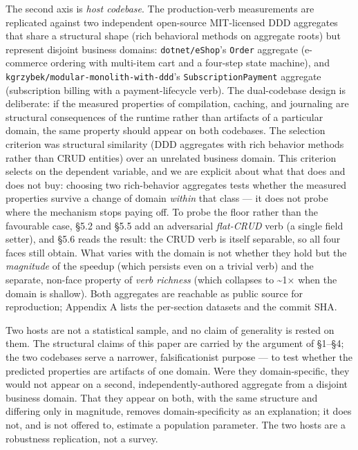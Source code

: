 \documentclass[
]{article}
\let\origtexttt\texttt%
\renewcommand{\texttt}[1]{\origtexttt{\seqsplit{#1}}}%
\let\texttt\origtexttt%
\begin{document}
The second axis is \emph{host codebase}. The production-verb
measurements are replicated against two independent open-source
MIT-licensed DDD aggregates that share a structural shape (rich
behavioral methods on aggregate roots) but represent disjoint business
domains: \texttt{dotnet/eShop}'s \texttt{Order} aggregate (e-commerce
ordering with multi-item cart and a four-step state machine), and
\texttt{kgrzybek/modular-monolith-with-ddd}'s
\texttt{SubscriptionPayment} aggregate (subscription billing with a
payment-lifecycle verb). The dual-codebase design is deliberate: if the
measured properties of compilation, caching, and journaling are
structural consequences of the runtime rather than artifacts of a
particular domain, the same property should appear on both codebases.
The selection criterion was structural similarity (DDD aggregates with
rich behavior methods rather than CRUD entities) over an unrelated
business domain. This criterion selects on the dependent variable, and
we are explicit about what that does and does not buy: choosing two
rich-behavior aggregates tests whether the measured properties survive a
change of domain \emph{within} that class --- it does not probe where
the mechanism stops paying off. To probe the floor rather than the
favourable case, §5.2 and §5.5 add an adversarial \emph{flat-CRUD} verb
(a single field setter), and §5.6 reads the result: the CRUD verb is
itself separable, so all four faces still obtain. What varies with the
domain is not whether they hold but the \emph{magnitude} of the speedup
(which persists even on a trivial verb) and the separate, non-face
property of \emph{verb richness} (which collapses to \textasciitilde1×
when the domain is shallow). Both aggregates are reachable as public
source for reproduction; Appendix A lists the per-section datasets and
the commit SHA.

Two hosts are not a statistical sample, and no claim of generality is
rested on them. The structural claims of this paper are carried by the
argument of §1--§4; the two codebases serve a narrower, falsificationist
purpose --- to test whether the predicted properties are artifacts of
one domain. Were they domain-specific, they would not appear on a
second, independently-authored aggregate from a disjoint business
domain. That they appear on both, with the same structure and differing
only in magnitude, removes domain-specificity as an explanation; it does
not, and is not offered to, estimate a population parameter. The two
hosts are a robustness replication, not a survey.
\end{document}
